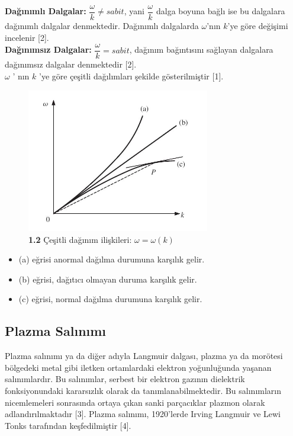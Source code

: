 \documentclass[a4paper,11pt]{article}
\begin{document}
\newpage
\textbf{Dağınımlı Dalgalar:} $ \dfrac{\omega}{k} \neq sabit $, yani $ \dfrac{\omega}{k} $ dalga boyuna bağlı ise bu dalgalara dağınımlı dalgalar denmektedir. Dağınımlı dalgalarda $ \omega $'nın $ k $'ye göre değişimi incelenir [2].\\

\textbf{Dağınımsız Dalgalar:} $ \dfrac{\omega}{k} = sabit $, dağınım bağıntısını sağlayan dalgalara dağınımsız dalgalar denmektedir  [2]. \\

$ \omega  $ ' nın $ k $ 'ye göre çeşitli dağılımları şekilde  gösterilmiştir [1]. 

\begin{figure}[h]
	\centering
	\includegraphics[width=8cm,keepaspectratio=true]{img/Dispersiyon.jpg}
	\caption* {\textbf{1.2} Çeşitli dağınım ilişkileri: $ \omega = \omega (k) $ }
\end{figure}

\begin{itemize}
	\item (a) eğrisi anormal dağılma durumuna karşılık gelir.
    \item (b) eğrisi, dağıtıcı olmayan duruma karşılık gelir.
    \item(c) eğrisi, normal dağılma durumuna karşılık gelir.
\end{itemize}


\newpage 

\begin{center}
	\section{Plazma Salınımı}
\end{center}

Plazma salınımı ya da diğer adıyla Langmuir dalgası, plazma ya da morötesi bölgedeki metal gibi iletken ortamlardaki elektron yoğunluğunda yaşanan salınımlardır. Bu salınımlar, serbest bir elektron gazının dielektrik fonksiyonundaki kararsızlık olarak da tanımlanabilmektedir. Bu salınımların nicemlemeleri sonrasında ortaya çıkan sanki parçacıklar plazmon olarak adlandırılmaktadır [3]. Plazma salınımı, 1920'lerde Irving Langmuir ve Lewi Tonks tarafından keşfedilmiştir [4].\\
\end{document}
